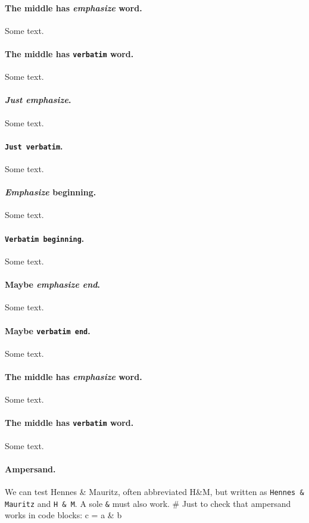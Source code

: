 \documentclass[%
oneside,                 %
final,                   %
10pt]{article}
\theoremstyle{definition}
\begin{document}
\begin{enumerate}
\paragraph{The middle has \emph{emphasize} word.}
Some text.
\paragraph{The middle has \texttt{verbatim} word.}
Some text.
\paragraph{\emph{Just emphasize}.}
Some text.
\paragraph{\texttt{Just verbatim}.}
Some text.
\paragraph{\emph{Emphasize} beginning.}
Some text.
\paragraph{\texttt{Verbatim beginning}.}
Some text.
\paragraph{Maybe \emph{emphasize end}.}
Some text.
\paragraph{Maybe \texttt{verbatim end}.}
Some text.
\paragraph{The middle has \emph{emphasize} word.}
Some text.
\paragraph{The middle has \texttt{verbatim} word.}
Some text.
\paragraph{Ampersand.}
We can test Hennes {\&} Mauritz, often abbreviated H{\&}M, but written
as \Verb!Hennes & Mauritz! and \Verb!H & M!.
A sole \Verb!&! must also work.
\bccq
# Just to check that ampersand works in code blocks:
c = a & b


\end{enumerate}
\end{document}
